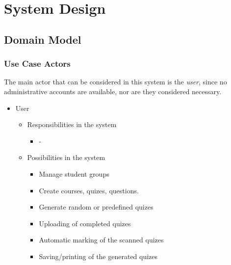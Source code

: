 \section{System Design}


\subsection{Domain Model}

\subsubsection{Use Case Actors}
The main actor that can be considered in this system is the \textit{user}, since no administrative accounts are available, nor are they considered necessary.
\begin{itemize}
  \item User
  \begin{itemize}
    \item Responsibilities in the system
    \begin{itemize}
      \item -
    \end{itemize}
    \item Possibilities in the system
    \begin{itemize}
      \item Manage student groups 
      \item Create courses, quizes, questions.
      \item Generate random or predefined quizes
      \item Uploading of completed quizes
      \item Automatic marking of the scanned quizes
      \item Saving/printing of the generated quizes
    \end{itemize}
  \end{itemize}
\end{itemize}


